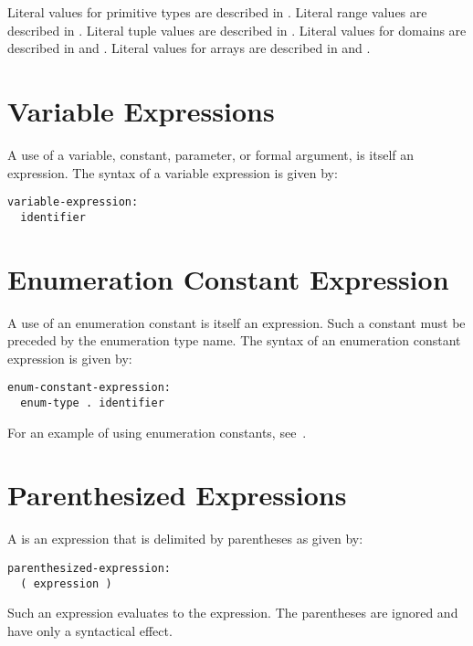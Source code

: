 Literal values for primitive types are described in
.
Literal range values are described in .
Literal tuple values are described in .
Literal values for domains are described in 
and .
Literal values for arrays are described in  
and .


\section{Variable Expressions}
\label{Variable_Expressions}

A use of a variable, constant, parameter, or formal argument, is
itself an expression.  The syntax of a variable expression is given
by:
\begin{syntax}
\begin{verbatim}
variable-expression:
  identifier 
\end{verbatim}
\end{syntax}

\section{Enumeration Constant Expression}
\label{Enumeration_Constant_Expression}

A use of an enumeration constant is itself an expression.  Such a
constant must be preceded by the enumeration type name.  The syntax of
an enumeration constant expression is given by:
\begin{syntax}
\begin{verbatim}
enum-constant-expression:
  enum-type . identifier
\end{verbatim}
\end{syntax}

For an example of using enumeration constants,
see~.

\section{Parenthesized Expressions}
\label{Parenthesized_Expressions}

A  is an expression that is delimited
by parentheses as given by:
\begin{syntax}
\begin{verbatim}
parenthesized-expression:
  ( expression )
\end{verbatim}
\end{syntax}
Such an expression evaluates to the expression.  The parentheses are
ignored and have only a syntactical effect.

